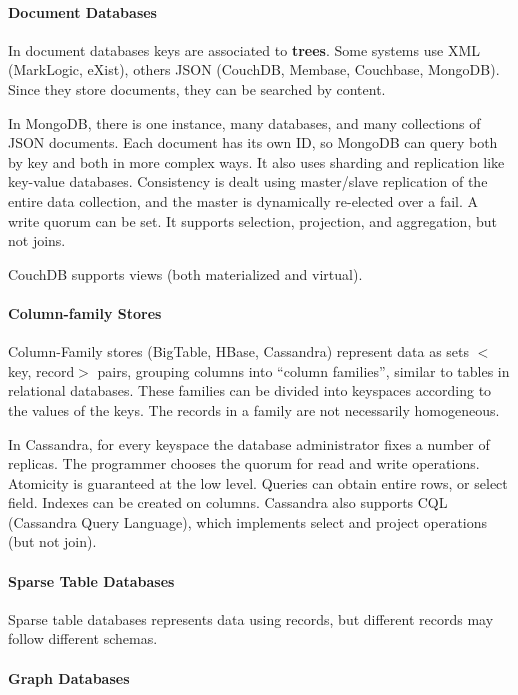 \paragraph{Document Databases}

In document databases keys are associated to \textbf{trees}. Some systems use XML (MarkLogic, eXist), others JSON (CouchDB, Membase, Couchbase, MongoDB). Since they store documents, they can be searched by content.

In MongoDB, there is one instance, many databases, and many collections of JSON documents. Each document has its own ID, so MongoDB can query both by key and both in more complex ways. It also uses sharding and replication like key-value databases. Consistency is dealt using master/slave replication of the entire data collection, and the master is dynamically re-elected over a fail. A write quorum can be set. It supports selection, projection, and aggregation, but not joins.

CouchDB supports views (both materialized and virtual).

\paragraph{Column-family Stores}

Column-Family stores (BigTable, HBase, Cassandra) represent data as sets $<$key, record$>$ pairs, grouping columns into ``column families'', similar to tables in relational databases. These families can be divided into keyspaces according to the values of the keys. The records in a family are not necessarily homogeneous.

In Cassandra, for every keyspace the database administrator fixes a number of replicas. The programmer chooses the quorum for read and write operations. Atomicity is guaranteed at the low level. Queries can obtain entire rows, or select field. Indexes can be created on columns. Cassandra also supports CQL (Cassandra Query Language), which implements select and project operations (but not join).

\paragraph{Sparse Table Databases}

Sparse table databases represents data using records, but different records may follow different schemas.

\paragraph{Graph Databases}

